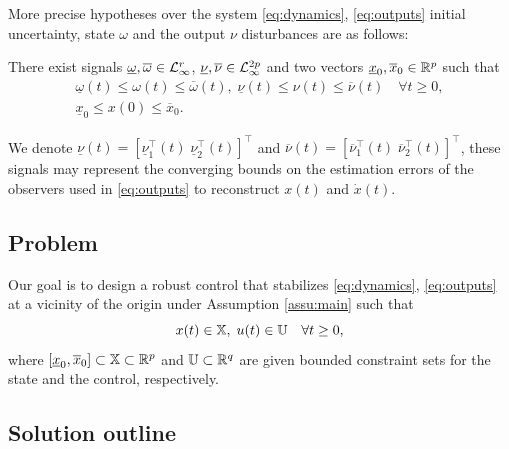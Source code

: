 \documentclass[letterpaper, 10 pt, conference]{ieeeconf}  %
\begin{document}
More precise hypotheses over the system \eqref{eq:dynamics}, \eqref{eq:outputs}
initial uncertainty, state $\omega$ and the output $\nu$ disturbances
are as follows:
\begin{assumption}
\label{assu:main} There exist signals $\underline{\omega},\overline{\omega}\in\mathcal{L}_{\infty}^{r}$,
$\underline{\nu},\overline{\nu}\in\mathcal{L}_{\infty}^{2p}$ and two vectors
$\underline{x}_{0},\overline{x}_{0}\in\mathbb{R}^{p}$ such that
\begin{gather*}
\underline{\omega}(t)\leq\omega(t)\leq\overline{\omega}(t),\;\underline{\nu}(t)\leq\nu(t)\leq\overline{\nu}(t)\quad\forall t\geq0,\\
\underline{x}_{0}\leq x(0)\leq\overline{x}_{0}.
\end{gather*}
\end{assumption}
We denote $\underline{\nu}(t)=[\underline{\nu}_{1}^{\top}(t)\;\underline{\nu}_{2}^{\top}(t)]^{\top}$
and $\overline{\nu}(t)=[\overline{\nu}_{1}^{\top}(t)\;\overline{\nu}_{2}^{\top}(t)]^{\top}$,
these signals may represent the converging bounds on the estimation
errors of the observers used in \eqref{eq:outputs} to reconstruct
$x(t)$ and $\dot{x}(t)$.

\subsection{Problem}

Our goal is to design a robust control that stabilizes \eqref{eq:dynamics},
\eqref{eq:outputs} at a vicinity of the origin under Assumption \ref{assu:main}
such that
\begin{equation}
x(t)\in\mathbb{X},\;u(t)\in\mathbb{U}\quad\forall t\geq0,\label{eq:constraints}
\end{equation}
where $[\underline{x}_{0},\overline{x}_{0}]\subset\mathbb{X}\subset\mathbb{R}^{p}$
and $\mathbb{U}\subset\mathbb{R}^{q}$ are given bounded constraint sets for the
state and the control, respectively.

\subsection{Solution outline}
\end{document}
